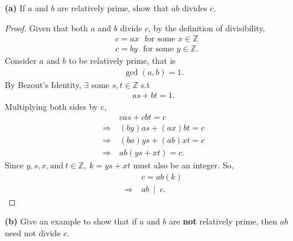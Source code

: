 \documentclass[12pt, letterpaper]{article}
\begin{document}
\textbf{(a)} If $a$ and $b$ are relatively prime, show that $ab$ divides $c$.
\begin{proof}
    Given that both $a$ and $b$ divide $c$, by the definition of divisibility,
    \begin{align*}
        &c = ax \ \ \ \text{for some $x \in \mathbb{Z}$} \\
        &c = by \ \ \ \text{for some $y \in \mathbb{Z}$}.
    \end{align*}
    Consider $a$ and $b$ to be relatively prime, that is
    \begin{align*}
        \gcd(a,b) = 1.
    \end{align*}
    By Bezout's Identity, $\exists$ some $s, t \in \mathbb{Z}$ s.t
    \begin{align*}
        as + bt = 1.
    \end{align*}
    Multiplying both sides by c,
    \begin{align*}
        &cas + cbt = c \\
      \Rightarrow \  &(by)as + (ax)bt = c \\
       \Rightarrow \  &(ba)ys + (ab)xt = c \\ 
       \Rightarrow \ &ab(ys + xt) =c.
    \end{align*}
    Since $y,s,x, \text{and} \ t \in \mathbb{Z}, \ k = ys + xt$ must also be an integer. So,
    \begin{align*}
        &c = ab(k) \\
        \Rightarrow \ &ab \ \mid \ c.
    \end{align*}
\end{proof}
\textbf{(b)} Give an example to show that if $a$ and $b$ are \textbf{not} relatively prime, then $ab$ need not divide $c$.
\begin{center}
     \\
    \begin{center}
\end{center}
\end{center}
\end{document}
